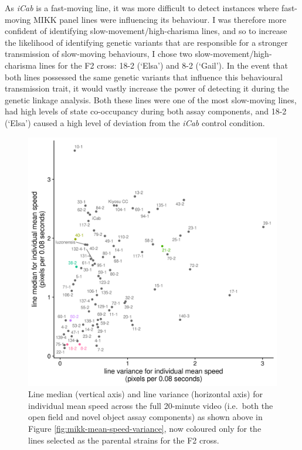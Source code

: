\documentclass[
]{book}
\begin{document}
As \emph{\textcolor{iCab_424B4D}{iCab}} is a fast-moving line, it was more difficult to detect instances where fast-moving MIKK panel lines were influencing its behaviour. I was therefore more confident of identifying slow-movement/high-charisma lines, and so to increase the likelihood of identifying genetic variants that are responsible for a stronger transmission of slow-moving behaviours, I chose two slow-movement/high-charisma lines for the F2 cross: \textcolor{18-2 (‘Elsa’)_FF66A6}{18-2 (‘Elsa’)} and \textcolor{8-2 (‘Gail’)_FF699C}{8-2 (‘Gail’)}. In the event that both lines possessed the same genetic variants that influence this behavioural transmission trait, it would vastly increase the power of detecting it during the genetic linkage analysis. Both these lines were one of the most slow-moving lines, had high levels of state co-occupancy during both assay components, and \textcolor{18-2 (‘Elsa’)_FF66A6}{18-2 (‘Elsa’)} caused a high level of deviation from the \emph{\textcolor{iCab_424B4D}{iCab}} control condition.



\begin{figure}
\includegraphics[width=1\linewidth]{figs/mikk_behaviour/line_mean_speed_variance_selected} \caption{Line median (vertical axis) and line variance (horizontal axis) for individual mean speed across the full 20-minute video (i.e.~both the open field and novel object assay components) as shown above in Figure \ref{fig:mikk-mean-speed-variance}, now coloured only for the lines selected as the parental strains for the F2 cross.}\label{fig:F0-line-mean-speed-var-select}
\end{figure}
\end{document}
